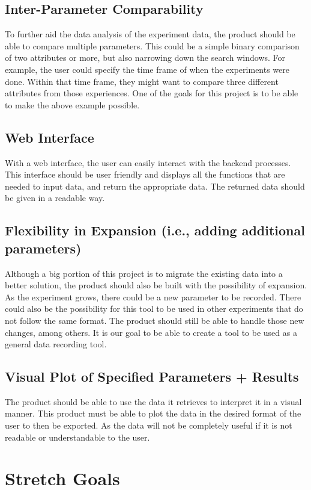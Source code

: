 \documentclass{article}
\begin{document}
\subsection*{Inter-Parameter Comparability}
To further aid the data analysis of the experiment data, the product should be able to compare multiple parameters.
This could be a simple binary comparison of two attributes or more, but also narrowing down the search windows.
For example, the user could specify the time frame of when the experiments were done. Within that time frame, they might want to compare three different attributes from those experiences.
One of the goals for this project is to be able to make the above example possible.


\subsection*{Web Interface}
With a web interface, the user can easily interact with the backend processes.
This interface should be user friendly and displays all the functions that are needed to input data, and return the appropriate data.
The returned data should be given in a readable way.


\subsection*{Flexibility in Expansion (i.e., adding additional parameters)}
Although a big portion of this project is to migrate the existing data into a better solution, the product should also be
built with the possibility of expansion. As the experiment grows, there could be a new parameter to be recorded.
There could also be the possibility for this tool to be used in other experiments that do not follow the same format. The product should still be able to handle those new changes, among others.
It is our goal to be able to create a tool to be used as a general data recording tool.


\subsection*{Visual Plot of Specified Parameters + Results}
The product should be able to use the data it retrieves to interpret it in a visual manner.
This product must be able to plot the data in the desired format of the user to then be exported.
As the data will not be completely useful if it is not readable or understandable to the user.

\section{Stretch Goals}
\end{document}
